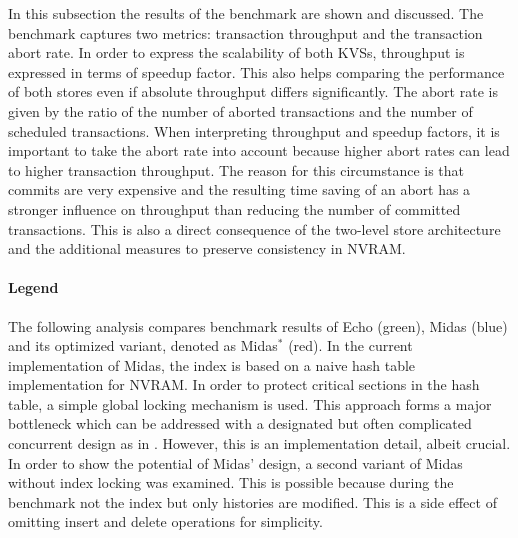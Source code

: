 In this subsection the results of the benchmark are shown and discussed. The
benchmark captures two metrics: transaction throughput and the transaction abort
rate. In order to express the scalability of both \acp{KVS}, throughput is expressed
in terms of speedup factor. This also helps comparing the performance of both
stores even if absolute throughput differs significantly. The abort rate is
given by the ratio of the number of aborted transactions and the number of
scheduled transactions. When interpreting throughput and speedup factors, it is
important to take the abort rate into account because higher abort rates can
lead to higher transaction throughput. The reason for this circumstance is that
commits are very expensive and the resulting time saving of an abort has a
stronger influence on throughput than reducing the number of committed
transactions. This is also a direct consequence of the two-level store
architecture and the additional measures to preserve consistency in NVRAM.

\paragraph{Legend}

The following analysis compares benchmark results of Echo (green), Midas (blue)
and its optimized variant, denoted as Midas$^{*}$ (red). In the current
implementation of Midas, the index is based on a naive hash table implementation
for NVRAM. In order to protect critical sections in the hash table, a simple
global locking mechanism is used. This approach forms a major bottleneck which
can be addressed with a designated but often complicated concurrent design as in
\cite{fan2013memc3}. However, this is an implementation detail, albeit crucial.
In order to show the potential of Midas' design, a second variant of Midas
without index locking was examined. This is possible because during the
benchmark not the index but only histories are modified. This is a side effect
of omitting insert and delete operations for simplicity.

\newcommand{\midasopt}{Midas$^{*}$\xspace}
\newcommand{\midas}{Midas\xspace}
\newcommand{\echo}{Echo\xspace}
\newcommand{\ttp}{transaction throughput\xspace}
\newcommand{\tput}{throughput\xspace}
\newcommand{\eff}{parallel efficiency\xspace}


